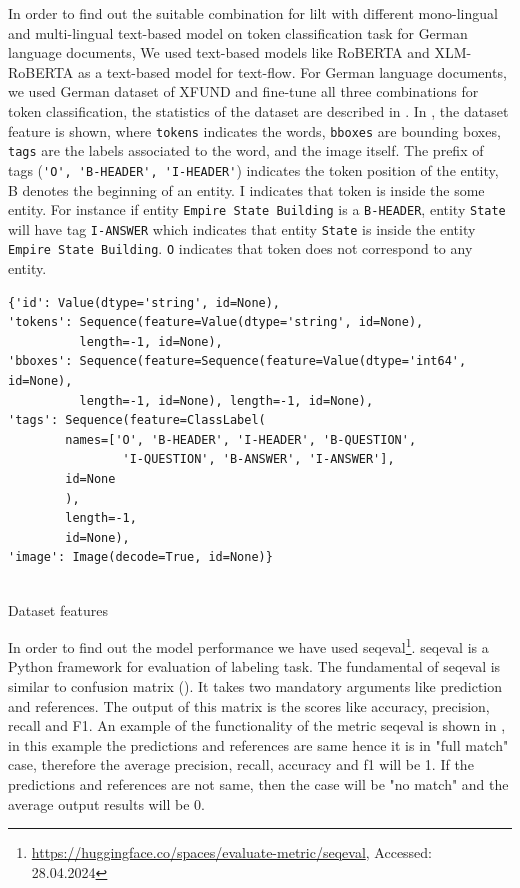In order to find out the suitable combination for \acrshort{lilt} with different mono-lingual and multi-lingual text-based model on token classification task for German language documents, We used text-based models like RoBERTA and XLM-RoBERTA as a text-based model for text-flow. For German language documents, we used German dataset of XFUND and fine-tune all three combinations for token classification, the statistics of the dataset are described in . In , the dataset feature is shown, where \verb|tokens| indicates the words, \verb|bboxes| are bounding boxes, \verb|tags| are the labels associated to the word, and the image itself. The prefix of tags (\verb|'O', 'B-HEADER', 'I-HEADER'|) indicates the token position of the entity, B denotes the beginning of an entity. I indicates that token is inside the some entity. For instance if entity \verb|Empire State Building| is a \verb|B-HEADER|, entity \verb|State| will have tag \verb|I-ANSWER| which indicates that entity \verb|State| is inside the entity \verb|Empire State Building|. \verb|O| indicates that token does not correspond to any entity. 

\begin{listing}[!ht]

\begin{verbatim}
{'id': Value(dtype='string', id=None),
'tokens': Sequence(feature=Value(dtype='string', id=None), 
          length=-1, id=None), 
'bboxes': Sequence(feature=Sequence(feature=Value(dtype='int64', id=None), 
          length=-1, id=None), length=-1, id=None),
'tags': Sequence(feature=ClassLabel(
        names=['O', 'B-HEADER', 'I-HEADER', 'B-QUESTION', 
                'I-QUESTION', 'B-ANSWER', 'I-ANSWER'], 
        id=None
        ), 
        length=-1, 
        id=None),
'image': Image(decode=True, id=None)}    
    
\end{verbatim}

\caption{Dataset features}
\label{Listing:dataset_deatures}   
\end{listing}

In order to find out the model performance we have used seqeval\footnote{\url{https://huggingface.co/spaces/evaluate-metric/seqeval}, Accessed: 28.04.2024}. seqeval is a Python framework for evaluation of labeling task. The fundamental of seqeval is similar to confusion matrix (). It takes two mandatory arguments like prediction and references. The output of this matrix is the scores like accuracy, precision, recall and F1. An example of the functionality of the metric seqeval is shown in , in this example the predictions and references are same hence it is in "full match" case, therefore the average precision, recall, accuracy and f1 will be 1. If the predictions and references are not same, then the case will be "no match" and the average output results will be 0. 

